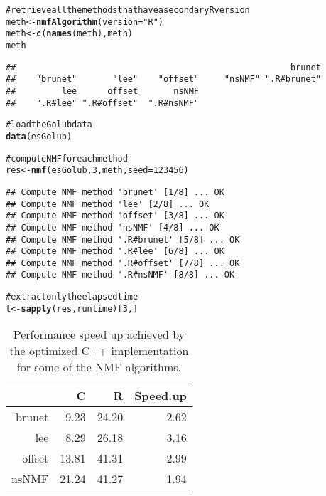 \documentclass[a4paper]{article}\usepackage{graphicx, color}
\makeatletter
\newcommand{\hlfunctioncall}[1]{\textcolor[rgb]{0.501960784313725,0,0.329411764705882}{\textbf{#1}}}%
\newcommand{\hlstring}[1]{\textcolor[rgb]{0.6,0.6,1}{#1}}%
\newcommand{\hlcomment}[1]{\textcolor[rgb]{0.180392156862745,0.6,0.341176470588235}{#1}}%
\newenvironment{kframe}{%
 \def\at@end@of@kframe{}%
 \ifinner\ifhmode%
  \def\at@end@of@kframe{\end{minipage}}%
  \begin{minipage}{\columnwidth}%
 \fi\fi%
 \def\FrameCommand##1{\hskip\@totalleftmargin \hskip-\fboxsep
 \colorbox{shadecolor}{##1}\hskip-\fboxsep
     \hskip-\linewidth \hskip-\@totalleftmargin \hskip\columnwidth}%
 \MakeFramed {\advance\hsize-\width
   \@totalleftmargin\z@ \linewidth\hsize
   \@setminipage}}%
 {\par\unskip\endMakeFramed%
 \at@end@of@kframe}
\newenvironment{knitrout}{}{} %
\makeatother
\begin{document}
\begin{knitrout}
\color{fgcolor}\begin{kframe}
\begin{alltt}
\hlcomment{# retrieve all the methods that have a secondary R version}
meth <- \hlfunctioncall{nmfAlgorithm}(version = \hlstring{"R"})
meth <- \hlfunctioncall{c}(\hlfunctioncall{names}(meth), meth)
meth
\end{alltt}
\begin{verbatim}
##                                                      brunet 
##    "brunet"       "lee"    "offset"     "nsNMF" ".R#brunet" 
##         lee      offset       nsNMF 
##    ".R#lee" ".R#offset"  ".R#nsNMF"
\end{verbatim}
\begin{alltt}

\hlcomment{# load the Golub data}
\hlfunctioncall{data}(esGolub)

\hlcomment{# compute NMF for each method}
res <- \hlfunctioncall{nmf}(esGolub, 3, meth, seed = 123456)
\end{alltt}
\begin{verbatim}
## Compute NMF method 'brunet' [1/8] ... OK
## Compute NMF method 'lee' [2/8] ... OK
## Compute NMF method 'offset' [3/8] ... OK
## Compute NMF method 'nsNMF' [4/8] ... OK
## Compute NMF method '.R#brunet' [5/8] ... OK
## Compute NMF method '.R#lee' [6/8] ... OK
## Compute NMF method '.R#offset' [7/8] ... OK
## Compute NMF method '.R#nsNMF' [8/8] ... OK
\end{verbatim}
\begin{alltt}

\hlcomment{# extract only the elapsed time}
t <- \hlfunctioncall{sapply}(res, runtime)[3, ]
\end{alltt}
\end{kframe}
\end{knitrout}


\begin{table}[ht]
\centering
\begin{tabular}{rrrr}
  \hline
 & C & R & Speed.up \\ 
  \hline
brunet & 9.23 & 24.20 & 2.62 \\ 
  lee & 8.29 & 26.18 & 3.16 \\ 
  offset & 13.81 & 41.31 & 2.99 \\ 
  nsNMF & 21.24 & 41.27 & 1.94 \\ 
   \hline
\end{tabular}
\caption{Performance speed up achieved by the optimized C++ implementation for some of the NMF algorithms.} 
\label{tab:perf}
\end{table}
\end{document}
